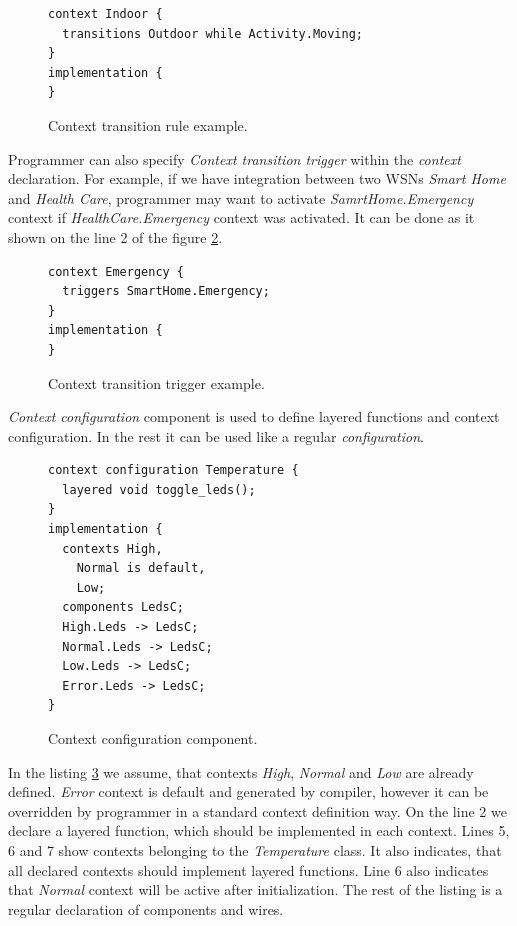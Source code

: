 \documentclass{ubicomp-ext}
\begin{document}
\begin{figure}
\begin{lstlisting}
context Indoor {
  transitions Outdoor while Activity.Moving;
}
implementation {
}
\end{lstlisting}
\caption{Context transition rule example.}
\label{fig:ctre}
\end{figure}

Programmer can also specify \textit{Context transition trigger} within the \textit{context} declaration. For example, if we have integration between two WSNs \textit{Smart Home} and \textit{Health Care}, programmer may want to activate \textit{SamrtHome.Emergency} context if \textit{HealthCare.Emergency} context was activated. It can be done as it shown on the line 2 of the figure \ref{fig:ctre}.

\begin{figure}[H]
\begin{lstlisting}
context Emergency {
  triggers SmartHome.Emergency;
}
implementation {
}
\end{lstlisting}
\caption{Context transition trigger example.}
\label{fig:ctre}
\end{figure}

\textit{Context configuration} component is used to define layered functions and context configuration. In the rest it can be used like a regular \textit{configuration}.

\begin{figure}
\begin{lstlisting}
context configuration Temperature {
  layered void toggle_leds();
}
implementation {
  contexts High,
    Normal is default,
    Low;
  components LedsC;
  High.Leds -> LedsC;
  Normal.Leds -> LedsC;
  Low.Leds -> LedsC;
  Error.Leds -> LedsC;
}
\end{lstlisting}
\caption{Context configuration component.}
\label{fig:ccc}
\end{figure}

In the listing \ref{fig:ccc} we assume, that contexts \textit{High}, \textit{Normal} and \textit{Low} are already defined. \textit{Error} context is default and generated by compiler, however it can be overridden by programmer in a standard context definition way. On the line 2 we declare a layered function, which should be implemented in each context. Lines 5, 6 and 7 show contexts belonging to the \textit{Temperature} class. It also indicates, that all declared contexts should implement layered functions. Line 6 also indicates that \textit{Normal} context will be active after initialization. The rest of the listing is a regular declaration of components and wires.
\end{document}
